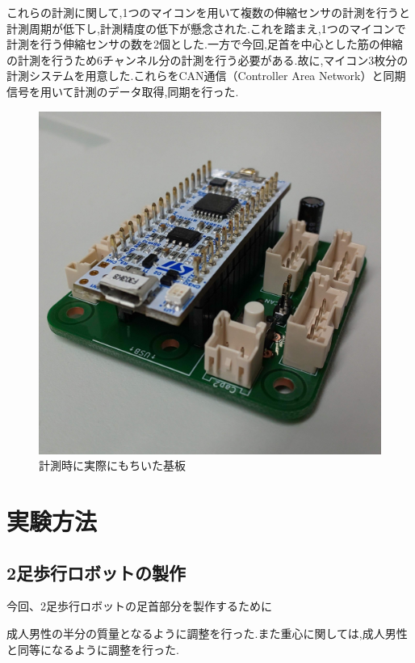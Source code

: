 これらの計測に関して,1つのマイコンを用いて複数の伸縮センサの計測を行うと計測周期が低下し,計測精度の低下が懸念された.これを踏まえ,1つのマイコンで計測を行う伸縮センサの数を2個とした.一方で今回,足首を中心とした筋の伸縮の計測を行うため6チャンネル分の計測を行う必要がある.故に,マイコン3枚分の計測システムを用意した.これらをCAN通信（Controller Area Network）と同期信号を用いて計測のデータ取得,同期を行った.
\begin{figure}[h]
 \begin{center}
  \includegraphics[width=0.75\columnwidth,clip]{Photo/BackGround/circuit.eps}
  \caption{計測時に実際にもちいた基板}
  \label{circuit}
 \end{center}
\end{figure}

\section{実験方法}
\subsection{2足歩行ロボットの製作}
今回、2足歩行ロボットの足首部分を製作するために

成人男性の半分の質量となるように調整を行った.また重心に関しては,成人男性と同等になるように調整を行った.

